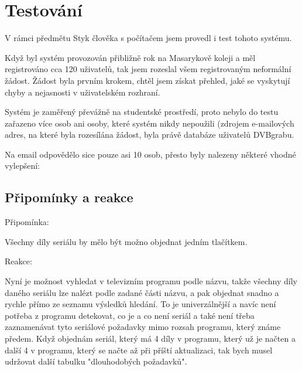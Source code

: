 \chapter{Testování}

V rámci předmětu Styk člověka s počítačem jsem provedl i test tohoto systému.

\vspace{10pt}

Když byl systém provozován přibližně rok na Masarykově koleji a měl registrováno cca 120 uživatelů, tak jsem rozeslal všem registrovaným neformální žádost. Žádost byla prvním krokem, chtěl jsem získat přehled, jaké se vyskytují chyby a nejasnosti v uživatelském rozhraní. 

\vspace{10pt}

Systém je zaměřený převážně na studentské prostředí, proto nebylo do testu zařazeno více osob ani osoby, které systém nikdy nepoužili (zdrojem e-mailových adres, na které byla rozesílána žádost, byla právě databáze uživatelů DVBgrabu.

\vspace{10pt}

Na email odpovědělo sice pouze asi 10 osob, přesto byly nalezeny některé vhodné vylepšení:

\vspace{10pt}

\section{Připomínky a reakce}

\begin{bf}Připomínka:\end{bf} Všechny díly seriálu by mělo být možno objednat jedním tlačítkem.

\begin{bf}Reakce:\end{bf} Nyní je možnost vyhledat v televizním programu podle názvu, takže všechny díly daného seriálu lze nalézt podle zadané části názvu, a pak objednat snadno a rychle přímo ze seznamu výsledků hledání. To je univerzálnější a navíc není potřeba z programu detekovat, co je a co není seriál a také není třeba zaznamenávat tyto seriálové požadavky mimo rozsah programu, který známe předem. Když objednám seriál, který má 4 díly v programu, který už je načten a další 4 v programu, který se načte až při příští aktualizaci, tak bych musel udržovat další tabulku "dlouhodobých požadavků".

